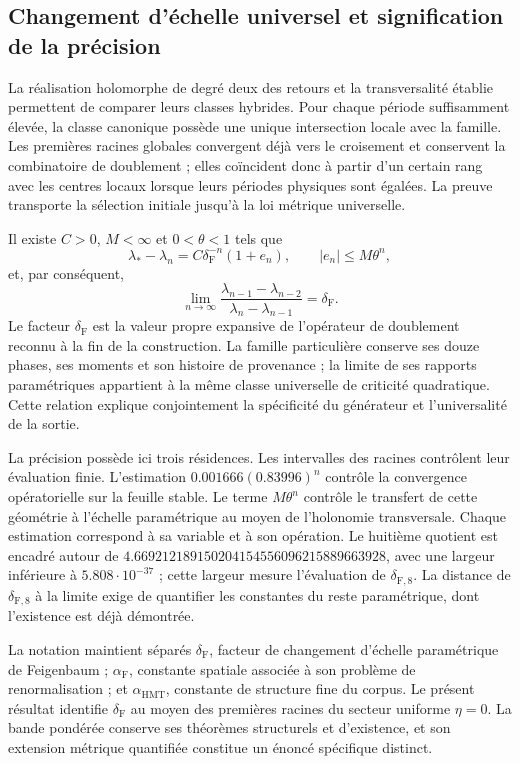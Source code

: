 \subsection{Changement d’échelle universel et signification de la précision}

La réalisation holomorphe de degré deux des retours et la transversalité
établie permettent de comparer leurs classes hybrides. Pour chaque période
suffisamment élevée, la classe canonique possède une unique intersection locale
avec la famille. Les premières racines globales convergent déjà vers le croisement et
conservent la combinatoire de doublement ; elles coïncident donc à partir d’un certain rang
avec les centres locaux lorsque leurs périodes physiques sont égalées. La preuve
transporte la sélection initiale jusqu’à la loi métrique universelle.

Il existe \(C>0\), \(M<\infty\) et \(0<\theta<1\) tels que
\[
\lambda_*-\lambda_n=C\delta_{\mathrm F}^{-n}(1+e_n),
\qquad |e_n|\le M\theta^n,
\]
et, par conséquent,
\[
\lim_{n\to\infty}
\frac{\lambda_{n-1}-\lambda_{n-2}}
{\lambda_n-\lambda_{n-1}}=\delta_{\mathrm F}.
\]
Le facteur \(\delta_{\mathrm F}\) est la valeur propre expansive de l’opérateur de doublement
reconnu à la fin de la construction. La famille particulière conserve ses
douze phases, ses moments et son histoire de provenance ; la limite de ses
rapports paramétriques appartient à la même classe universelle de criticité
quadratique. Cette relation explique conjointement la spécificité du
générateur et l’universalité de la sortie.

La précision possède ici trois résidences. Les intervalles des racines
contrôlent leur évaluation finie. L’estimation
\(0.001666(0.83996)^n\) contrôle la convergence opératorielle sur la feuille
stable. Le terme \(M\theta^n\) contrôle le transfert de cette géométrie à
l’échelle paramétrique au moyen de l’holonomie transversale. Chaque estimation
correspond à sa variable et à son opération. Le huitième quotient est encadré
autour de \(4.669212189150204154556096215889663928\), avec une largeur inférieure
à \(5.808\cdot10^{-37}\) ; cette largeur mesure l’évaluation de \(\delta_{\mathrm F,8}\).
La distance de \(\delta_{\mathrm F,8}\) à la limite exige de quantifier les constantes
du reste paramétrique, dont l’existence est déjà démontrée.

La notation maintient séparés \(\delta_{\mathrm F}\), facteur de changement d’échelle paramétrique
de Feigenbaum ; \(\alpha_{\mathrm F}\), constante spatiale associée à son
problème de renormalisation ; et \(\alpha_{\mathrm{HMT}}\), constante de
structure fine du corpus. Le présent résultat identifie \(\delta_{\mathrm F}\)
au moyen des premières racines du secteur uniforme \(\eta=0\). La bande
pondérée conserve ses théorèmes structurels et d’existence, et son extension
métrique quantifiée constitue un énoncé spécifique distinct.

